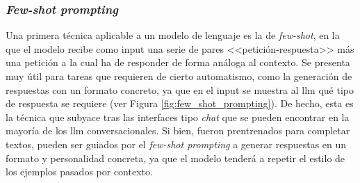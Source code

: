 \subsubsection{\textit{Few-shot prompting}}
\label{sec:few_shot_prompting}

Una primera técnica aplicable a un modelo de lenguaje es la de \textit{few-shot}, en la que el modelo recibe como input una serie de pares <<petición-respuesta>> más una petición a la cual ha de responder de forma análoga al contexto. Se presenta muy útil para tareas que requieren de cierto automatismo, como la generación de respuestas con un formato concreto, ya que en el input se muestra al \gls{llm} qué tipo de respuesta se requiere (ver Figura \ref{fig:few_shot_prompting}). De hecho, esta es la técnica que subyace tras las interfaces tipo \textit{chat} que se pueden encontrar en la mayoría de los \gls{llm} conversacionales. Si bien, fueron prentrenados para completar textos, pueden ser guiados por el \textit{few-shot prompting} a generar respuestas en un formato y personalidad concreta, ya que el modelo tenderá a repetir el estilo de los ejemplos pasados por contexto.



